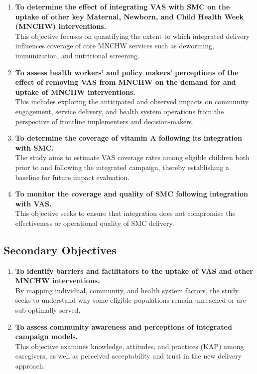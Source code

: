 \documentclass[
  11pt,
]{report}
\begin{document}
\begin{enumerate}
\def\labelenumi{\arabic{enumi}.}
\item
  \textbf{To determine the effect of integrating VAS with SMC on the
  uptake of other key Maternal, Newborn, and Child Health Week (MNCHW)
  interventions.}\\
  This objective focuses on quantifying the extent to which integrated
  delivery influences coverage of core MNCHW services such as deworming,
  immunization, and nutritional screening.
\item
  \textbf{To assess health workers' and policy makers' perceptions of
  the effect of removing VAS from MNCHW on the demand for and uptake of
  MNCHW interventions.}\\
  This includes exploring the anticipated and observed impacts on
  community engagement, service delivery, and health system operations
  from the perspective of frontline implementers and decision-makers.
\item
  \textbf{To determine the coverage of vitamin A following its
  integration with SMC.}\\
  The study aims to estimate VAS coverage rates among eligible children
  both prior to and following the integrated campaign, thereby
  establishing a baseline for future impact evaluation.
\item
  \textbf{To monitor the coverage and quality of SMC following
  integration with VAS.}\\
  This objective seeks to ensure that integration does not compromise
  the effectiveness or operational quality of SMC delivery.
\end{enumerate}

\subsection{Secondary Objectives}\label{secondary-objectives}

\begin{enumerate}
\def\labelenumi{\arabic{enumi}.}
\item
  \textbf{To identify barriers and facilitators to the uptake of VAS and
  other MNCHW interventions.}\\
  By mapping individual, community, and health system factors, the study
  seeks to understand why some eligible populations remain unreached or
  are sub-optimally served.
\item
  \textbf{To assess community awareness and perceptions of integrated
  campaign models.}\\
  This objective examines knowledge, attitudes, and practices (KAP)
  among caregivers, as well as perceived acceptability and trust in the
  new delivery approach.
\end{enumerate}
\end{document}
